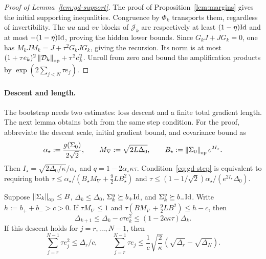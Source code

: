 \begin{proof}[Proof of Lemma~\ref{lem:gd-support}]
The proof of Proposition~\ref{lem:margins} gives the initial supporting
inequalities. Congruence by $\Phi_k$ transports them, regardless of
invertibility. The $uu$ and $vv$ blocks of $\mathcal J_k$ are respectively
at least $(1-\eta)\mathrm{Id}$ and at most $-(1-\eta)\mathrm{Id}$, proving the hidden
lower bounds. Since $G_kJ+JG_k=0$, one has
$M_kJM_k=J+\tau^2G_kJG_k$, giving the recursion. Its norm is at most
$(1+\tau e_k)^2\left\lVert \mathcal D_k \right\rVert_{\mathrm{op}}+\tau^2e_k^2$.
Unroll from zero and bound the amplification products by
$\exp(2\sum_{j<N}\tau e_j)$.
\end{proof}
\paragraph{Descent and length.}
The bootstrap needs two estimates: loss descent and a finite total
gradient length. The next lemma obtains both from the same step condition.
For the proof, abbreviate the descent scale, initial gradient bound, and
covariance bound as
\begin{equation}\label{eq:gd-constants}
 \alpha_\star:=\frac{g(\Sigma_0)}{2\sqrt2},\qquad
 M_{\nabla}:=\sqrt{2L\Delta_0},\qquad
 B_\star:=\left\lVert \Sigma_0 \right\rVert_{\mathrm{op}}e^{2I_\star}.
\end{equation}
Then $I_\star=\sqrt{2\Delta_0/\kappa}/\alpha_\star$ and
$q=1-2\alpha_\star\kappa\tau$. Condition~\eqref{eq:gd-step} is
equivalent to requiring both
$\tau\le\alpha_\star/(B_\star M_{\nabla}+\frac92LB_\star^2)$ and
$\tau\le(1-1/\sqrt2)\alpha_\star/(e^{2I_\star}\Delta_0)$.
\begin{lemma}\label{lem:gd-descent}
Suppose $\left\lVert \Sigma_k \right\rVert_{\mathrm{op}}\le B$, $\Delta_k\le\Delta_0$,
$\Sigma^u_k\succeq b_+\mathrm{Id}$, and $\Sigma^v_k\succeq b_-\mathrm{Id}$.
Write $h:=b_++b_->c>0$. If $\tau M_{\nabla}\le1$ and
$\tau(BM_{\nabla}+\frac92LB^2)\le h-c$, then
\begin{equation}\label{eq:gd-descent}
 \Delta_{k+1}\le\Delta_k-c\tau e_k^2
 \le(1-2c\kappa\tau)\Delta_k.
\end{equation}
If this descent holds for $j=r,\ldots,N-1$, then
\begin{equation}\label{eq:gd-length}
 \sum_{j=r}^{N-1}\tau e_j^2\le\Delta_r/c,\qquad
 \sum_{j=r}^{N-1}\tau e_j
 \le\frac1c\sqrt{\frac2\kappa}
            (\sqrt{\Delta_r}-\sqrt{\Delta_N}).
\end{equation}
\end{lemma}

